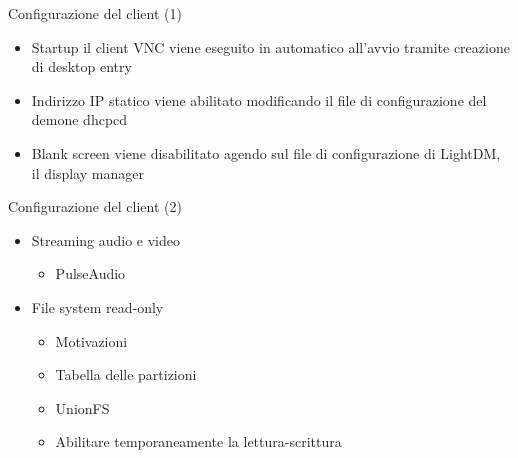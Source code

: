 \documentclass{beamer}
\begin{document}
\begin{frame}[fragile]{Configurazione del client (1)}
 \begin{itemize}
    \setlength\itemsep{2em}
     \item Startup\newline
     il client VNC viene eseguito in automatico all'avvio tramite creazione di desktop entry

     \item Indirizzo IP statico\newline
     viene abilitato modificando il file di configurazione del demone dhcpcd
     \item Blank screen\newline
     viene disabilitato agendo sul file di configurazione di LightDM, il display manager
 \end{itemize}

\end{frame}

\begin{frame}[fragile]{Configurazione del client (2)}
 \begin{itemize}
   \setlength\itemsep{2em}
     \item Streaming audio e video
     \vspace{0.5em}
        \begin{itemize}
           \setlength\itemsep{0.5em}
        \item PulseAudio
        \end{itemize}
     \item File system read-only
     \vspace{0.5em}
        \begin{itemize}
        \setlength\itemsep{0.5em}
        \item Motivazioni
        \item Tabella delle partizioni
        \item UnionFS
        \item Abilitare temporaneamente la lettura-scrittura
        \end{itemize}

 \end{itemize}
\end{frame}
\end{document}
